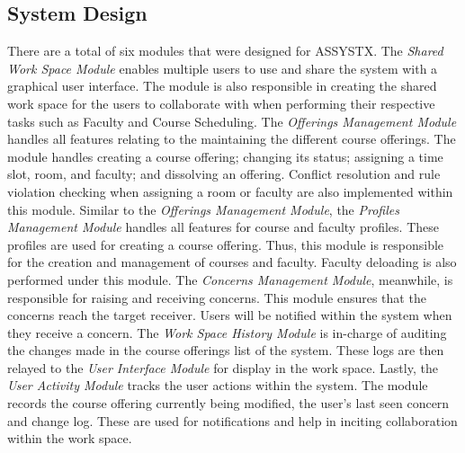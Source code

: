\subsection{System Design}
There are a total of six modules that were designed for ASSYSTX. The \textit{Shared Work Space Module} enables multiple users to use and share the system with a graphical user interface. The module is also responsible in creating the shared work space for the users to collaborate with when performing their respective tasks such as Faculty and Course Scheduling. The \textit{Offerings Management Module} handles all features relating to the maintaining the different course offerings. The module handles creating a course offering; changing its status; assigning a time slot, room, and faculty; and dissolving an offering. Conflict resolution and rule violation checking when assigning a room or faculty are also implemented within this module. Similar to the \textit{Offerings Management Module}, the \textit{Profiles Management Module} handles all features for course and faculty profiles. These profiles are used for creating a course offering. Thus, this module is responsible for the creation and management of courses and faculty. Faculty deloading is also performed under this module. The \textit{Concerns Management Module}, meanwhile, is responsible for raising and receiving concerns. This module ensures that the concerns reach the target receiver. Users will be notified within the system when they receive a concern. The \textit{Work Space History Module} is in-charge of auditing the changes made in the course offerings list of the system. These logs are then relayed to the \textit{User Interface Module} for display in the work space. Lastly, the \textit{User Activity Module} tracks the user actions within the system. The module records the course offering currently being modified, the user's last seen concern and change log. These are used for notifications and help in inciting collaboration within the work space.
